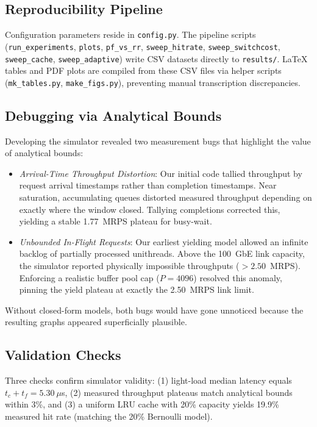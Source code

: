 \subsection{Reproducibility Pipeline}
Configuration parameters reside in \texttt{config.py}. The pipeline scripts (\texttt{run\_experiments}, \texttt{plots}, \texttt{pf\_vs\_rr}, \texttt{sweep\_hitrate}, \texttt{sweep\_switchcost}, \texttt{sweep\_cache}, \texttt{sweep\_adaptive}) write CSV datasets directly to \texttt{results/}. LaTeX tables and PDF plots are compiled from these CSV files via helper scripts (\texttt{mk\_tables.py}, \texttt{make\_figs.py}), preventing manual transcription discrepancies.

\subsection{Debugging via Analytical Bounds}
Developing the simulator revealed two measurement bugs that highlight the value of analytical bounds:
\begin{itemize}
\item \emph{Arrival-Time Throughput Distortion}: Our initial code tallied throughput by request arrival timestamps rather than completion timestamps. Near saturation, accumulating queues distorted measured throughput depending on exactly where the window closed. Tallying completions corrected this, yielding a stable 1.77~MRPS plateau for busy-wait.
\item \emph{Unbounded In-Flight Requests}: Our earliest yielding model allowed an infinite backlog of partially processed unithreads. Above the 100~GbE link capacity, the simulator reported physically impossible throughputs ($>2.50$~MRPS). Enforcing a realistic buffer pool cap ($P=4096$) resolved this anomaly, pinning the yield plateau at exactly the 2.50~MRPS link limit.
\end{itemize}
Without closed-form models, both bugs would have gone unnoticed because the resulting graphs appeared superficially plausible.

\subsection{Validation Checks}
Three checks confirm simulator validity: (1) light-load median latency equals $t_c + t_f = 5.30~\mu$s, (2) measured throughput plateaus match analytical bounds within 3\%, and (3) a uniform LRU cache with 20\% capacity yields 19.9\% measured hit rate (matching the 20\% Bernoulli model).
